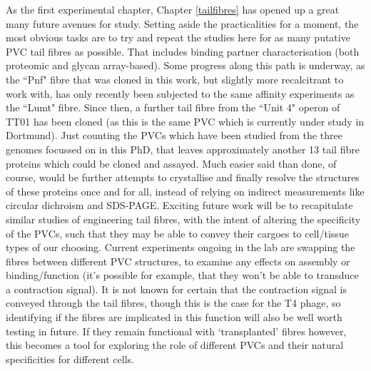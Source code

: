 As the first experimental chapter, Chapter \ref{tailfibres} has opened up a great many future avenues for study. Setting aside the practicalities for a moment, the most obvious tasks are to try and repeat the studies here for as many putative PVC tail fibres as possible. That includes binding partner characterisation (both proteomic and glycan array-based). Some progress along this path is underway, as the ``Pnf" fibre that was cloned in this work, but slightly more recalcitrant to work with, has only recently been subjected to the same affinity experiments as the ``Lumt" fibre. Since then, a further tail fibre from the ``Unit 4" operon of \Pasy{} TT01 has been cloned (as this is the same PVC which is currently under study in Dortmund). Just counting the PVCs which have been studied from the three genomes focussed on in this PhD, that leaves approximately another 13 tail fibre proteins which could be cloned and assayed. Much easier said than done, of course, would be further attempts to crystallise and finally resolve the structures of these proteins once and for all, instead of relying on indirect measurements like circular dichroism and SDS-PAGE. Exciting future work will be to recapitulate similar studies of engineering tail fibres, with the intent of altering the specificity of the PVCs, such that they may be able to convey their cargoes to cell/tissue types of our choosing. Current experiments ongoing in the lab are swapping the fibres between different PVC structures, to examine any effects on assembly or binding/function (it's possible for example, that they won't be able to transduce a contraction signal). It is not known for certain that the contraction signal is conveyed through the tail fibres, though this is the case for the T4 phage, so identifying if the fibres are implicated in this function will also be well worth testing in future. If they remain functional with `transplanted' fibres however, this becomes a tool for exploring the role of different PVCs and their natural specificities for different cells.

